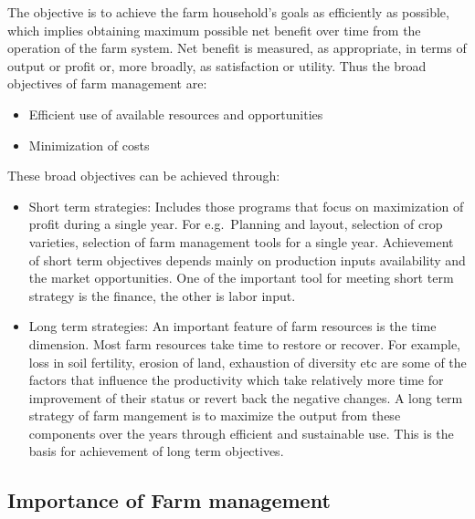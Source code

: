 \documentclass[11pt,]{book}
\providecommand{\tightlist}{%
  \setlength{\itemsep}{0pt}\setlength{\parskip}{0pt}}
\theoremstyle{definition}
\theoremstyle{definition}
\theoremstyle{definition}
\theoremstyle{remark}
\begin{document}
The objective is to achieve the farm household's goals as efficiently as
possible, which implies obtaining maximum possible net benefit over time
from the operation of the farm system. Net benefit is measured, as
appropriate, in terms of output or profit or, more broadly, as
satisfaction or utility. Thus the broad objectives of farm management
are:

\begin{itemize}
\tightlist
\item
  Efficient use of available resources and opportunities
\item
  Minimization of costs
\end{itemize}

These broad objectives can be achieved through:

\begin{itemize}
\item
  Short term strategies: Includes those programs that focus on
  maximization of profit during a single year. For e.g.~Planning and
  layout, selection of crop varieties, selection of farm management
  tools for a single year. Achievement of short term objectives depends
  mainly on production inputs availability and the market opportunities.
  One of the important tool for meeting short term strategy is the
  finance, the other is labor input.
\item
  Long term strategies: An important feature of farm resources is the
  time dimension. Most farm resources take time to restore or recover.
  For example, loss in soil fertility, erosion of land, exhaustion of
  diversity etc are some of the factors that influence the productivity
  which take relatively more time for improvement of their status or
  revert back the negative changes. A long term strategy of farm
  mangement is to maximize the output from these components over the
  years through efficient and sustainable use. This is the basis for
  achievement of long term objectives.
\end{itemize}

\subsection{Importance of Farm
management}\label{importance-of-farm-management}
\end{document}
